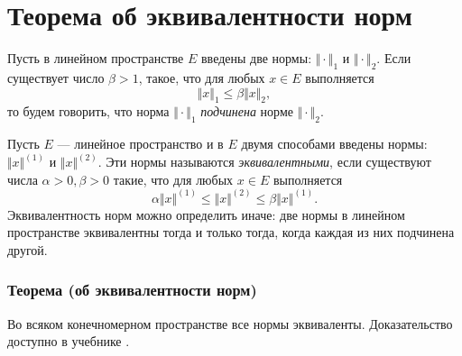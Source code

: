 \section{Теорема об эквивалентности норм}

Пусть в линейном пространстве $E$ введены две нормы: $\Vert \cdot \Vert_1$ и $\Vert \cdot \Vert_2$. Если существует число $\beta > 1$, такое, что для любых $x \in E$ выполняется
$$\Vert x \Vert_1 \leqslant \beta \Vert x \Vert_2,$$
то будем говорить, что норма $\Vert \cdot \Vert_1$ \textit{подчинена} норме $\Vert \cdot \Vert_2$.

Пусть $E$ --- линейное пространство и в $E$ двумя способами введены нормы: $\Vert x \Vert^{(1)}$ и $\Vert x \Vert^{(2)}$. Эти нормы называются \textit{эквивалентными}, если существуют числа $\alpha > 0, \beta > 0$ такие, что для любых $x \in E$ выполняется
$$\alpha\Vert x \Vert^{(1)} \leqslant \Vert x \Vert^{(2)} \leqslant \beta\Vert x \Vert^{(1)}.$$
Эквивалентность норм можно определить иначе: две нормы в линейном пространстве эквивалентны тогда и только тогда, когда каждая из них подчинена другой.

\subsubsection*{Теорема (об эквивалентности норм)}
Во всяком конечномерном пространстве все нормы эквиваленты. Доказательство доступно в учебнике \cite[с.~28]{trenogin}.
